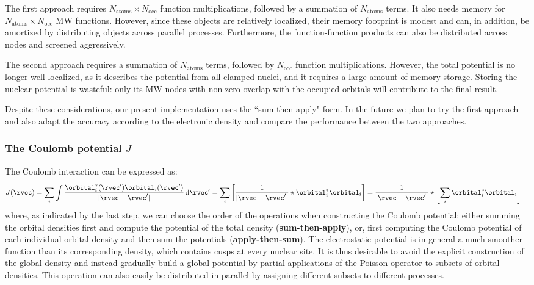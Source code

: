 The first approach requires $N_{\mathrm{atoms}}\times N_{\mathrm{occ}}$ function multiplications, followed by a summation of $N_{\mathrm{atoms}}$ terms. It also needs memory for $N_{\mathrm{atoms}}\times N_{\mathrm{occ}}$ \ac{MW} functions. However, since these objects are relatively localized, their memory footprint is modest and can, in addition, be amortized by distributing objects across parallel processes. Furthermore, the function-function products can also be distributed across nodes and screened aggressively.

The second approach requires a summation of $N_{\mathrm{atoms}}$ terms, followed by $N_{\mathrm{occ}}$ function multiplications. However, the total potential is no longer well-localized, as it describes the potential from all clamped nuclei, and it requires a large amount of memory storage. Storing the nuclear potential is wasteful: only its \ac{MW} nodes with non-zero overlap with the occupied orbitals will contribute to the final result.

Despite these considerations, our present implementation uses the ``sum-then-apply" form. In the future we plan to try the first approach and also adapt the accuracy according to the electronic density and compare the performance between the two approaches.


\subsubsection{The Coulomb potential $J$}\label{sec:compute-J}
The Coulomb interaction can be expressed as:
\begin{equation}
    \begin{aligned}
  J(\rvec) &= \sum_i \int \frac{\orbital^*_i(\rvec')\orbital_i(\rvec')}{|\rvec-\rvec'|} \, \mathrm{d}\rvec' =
  \sum_i  \left[
  \frac{1}{|\rvec-\rvec'|} \star 
  \orbital^*_i\orbital_i
  \right] =
  \frac{1}{|\rvec-\rvec'|} \star 
  \left[\sum_i 
  \orbital^*_i\orbital_i
  \right]
    \end{aligned}
\end{equation}
where, as indicated by the last step, we can choose the order of the operations when constructing the Coulomb potential: either summing the orbital densities first and compute the potential of the total density (\textbf{sum-then-apply}), or, first computing the Coulomb potential of each individual orbital density and then sum the potentials (\textbf{apply-then-sum}). The electrostatic potential is in general a much smoother function than its corresponding density, which contains cusps at every nuclear site. It is thus desirable to avoid the explicit construction of the global density and instead gradually build a global potential by partial applications of the Poisson operator to subsets of orbital densities. This operation can also easily be distributed in parallel by assigning different subsets to different processes.

